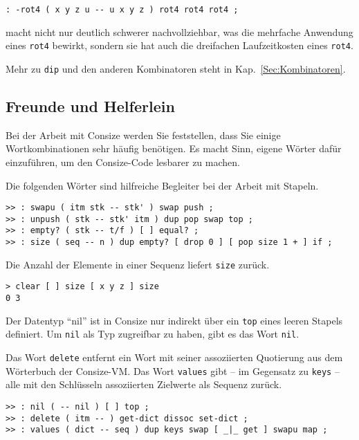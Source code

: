 \begin{verbatim}
: -rot4 ( x y z u -- u x y z ) rot4 rot4 rot4 ;
\end{verbatim}

macht nicht nur deutlich schwerer nachvollziehbar, was die mehrfache Anwendung eines \verb|rot4| bewirkt, sondern sie hat auch die dreifachen Laufzeitkosten eines \verb|rot4|.

Mehr zu \verb|dip| und den anderen Kombinatoren steht in Kap.~\ref{Sec:Kombinatoren}.

\subsection{Freunde und Helferlein}

Bei der Arbeit mit Consize werden Sie feststellen, dass Sie einige Wortkombinationen sehr häufig benötigen. Es macht Sinn, eigene Wörter dafür einzuführen, um den Consize-Code lesbarer zu machen.

Die folgenden Wörter sind hilfreiche Begleiter bei der Arbeit mit Stapeln. 

\begin{verbatim}
>> : swapu ( itm stk -- stk' ) swap push ;
>> : unpush ( stk -- stk' itm ) dup pop swap top ;
>> : empty? ( stk -- t/f ) [ ] equal? ;
>> : size ( seq -- n ) dup empty? [ drop 0 ] [ pop size 1 + ] if ;
\end{verbatim}

Die Anzahl der Elemente in einer Sequenz liefert \verb|size| zurück.

\begin{verbatim}
> clear [ ] size [ x y z ] size
0 3
\end{verbatim}

Der Datentyp "`nil"' ist in Consize nur indirekt über ein \verb|top| eines leeren Stapels definiert. Um \verb|nil| als Typ zugreifbar zu haben, gibt es das Wort \verb|nil|.

Das Wort \verb|delete| entfernt ein Wort mit seiner assoziierten Quotierung aus dem Wörterbuch der Consize-VM. Das Wort \verb|values| gibt -- im Gegensatz zu \verb|keys| -- alle mit den Schlüsseln assoziierten Zielwerte als Sequenz zurück.

\begin{verbatim}
>> : nil ( -- nil ) [ ] top ;
>> : delete ( itm -- ) get-dict dissoc set-dict ;
>> : values ( dict -- seq ) dup keys swap [ _|_ get ] swapu map ;
\end{verbatim}

